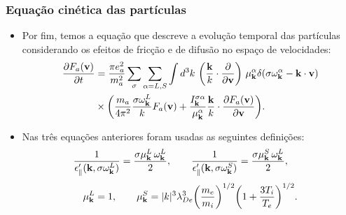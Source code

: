 \documentclass[10pt,aspectratio=1610,lualatex]{beamer}
\begin{document}
\begin{frame}
  \frametitle{Equação cinética das partículas}
  \begin{itemize}
    \item Por fim, temos a equação que descreve a evolução temporal
    das partículas considerando os efeitos de fricção e de difusão no
    espaço de velocidades:
    \begin{equation*}
      \begin{split}
	\frac{\partial F_a({\bf v})}{\partial t}
	&=\frac{\pi e_a^2}{m_a^2} \sum_\sigma\sum_{\alpha=L,S}
	\int d^3k\ \biggl(\frac{\bf k}{k} \cdot
	\frac{\partial}{\partial{\bf v}}\biggr)\ \mu_{\bf k}^\alpha
	\delta(\sigma\omega_{\bf k}^\alpha-{\bf k}\cdot{\bf v})\\
	&\times\biggl(\frac{m_a}{4\pi^2}\frac{\sigma\omega_{\bf k}^L}{k}
	F_a({\bf v})+\frac{I_{\bf k}^{\sigma\alpha}}{\mu_{\bf k}^\alpha}
	\frac{\bf k}{k}\cdot
	\frac{\partial F_a({\bf v})}{\partial{\bf v}}\biggr).
      \end{split}
    \end{equation*}
    \pause
    \item Nas três equações anteriores foram usadas as seguintes
    definições:
    \begin{displaymath}
      \frac{1}{\epsilon '_\parallel({\bf k},\sigma\omega_{\bf k}^L)}
      =\frac{\sigma\mu_{\bf k}^L\,\omega_{\bf k}^L}{2},\qquad
      \frac{1}{\epsilon '_\parallel({\bf k},\sigma\omega_{\bf k}^S)}
      =\frac{\sigma\mu_{\bf k}^S\,\omega_{\bf k}^L}{2},\qquad
    \end{displaymath}
    \begin{displaymath}
      \mu_{\bf k}^L=1,\qquad
      \mu_{\bf k}^S=|k|^3\lambda_{De}^3\biggl(\frac{m_e}{m_i}\biggr)^{1/2}
      \biggl(1+\frac{3T_i}{T_e}\biggr)^{1/2}.
    \end{displaymath}
  \end{itemize}
\end{frame}
\end{document}
